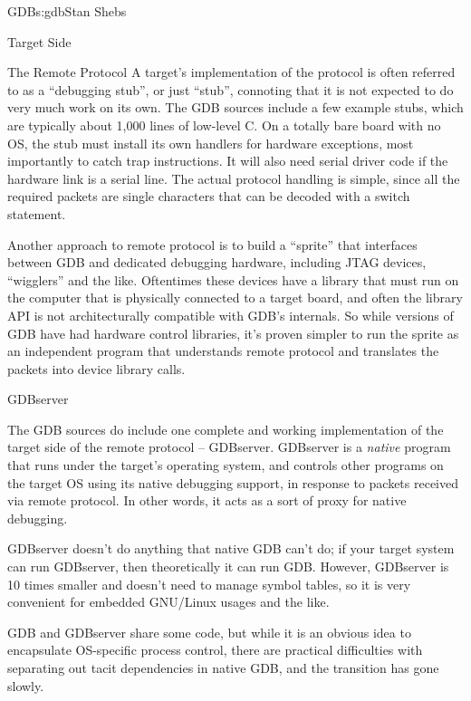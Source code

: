 \begin{aosachapter}{GDB}{s:gdb}{Stan Shebs}
\begin{aosasect1}{Target Side}
\begin{aosasect2}{The Remote Protocol}
A target's implementation of the protocol is often referred to as a
``debugging stub'', or just ``stub'', connoting that it is not expected
to do very much work on its own.  The GDB sources include a few
example stubs, which are typically about 1,000 lines of low-level C.
On a totally bare board with no OS, the stub must install its own
handlers for hardware exceptions, most importantly to catch trap
instructions.  It will also need serial driver code if the hardware
link is a serial line.  The actual protocol handling is simple, since
all the required packets are single characters that can be decoded
with a switch statement.

Another approach to remote protocol is to build a ``sprite'' that
interfaces between GDB and dedicated debugging hardware, including
JTAG devices, ``wigglers'' and the like.  Oftentimes these devices
have a library that must run on the computer that is physically
connected to a target board, and often the library API is not
architecturally compatible with GDB's internals.  So while versions of
GDB have had hardware control libraries, it's proven simpler to run
the sprite as an independent program that understands remote protocol
and translates the packets into device library calls.

\end{aosasect2}

\begin{aosasect2}{GDBserver}

The GDB sources do include one complete and working implementation of
the target side of the remote protocol -- GDBserver.  GDBserver is a
{\em native} program that runs under the target's operating system,
and controls other programs on the target OS using its native
debugging support, in response to packets received via remote protocol.
In other words, it acts as a sort of proxy for native debugging.

GDBserver doesn't do anything that native GDB can't do; if your target
system can run GDBserver, then theoretically it can run GDB.  However,
GDBserver is 10 times smaller and doesn't need to manage symbol
tables, so it is very convenient for embedded GNU/Linux usages and the
like.


GDB and GDBserver share some code, but while it is an obvious idea to
encapsulate OS-specific process control, there are practical difficulties
with separating out tacit dependencies in native GDB, and the transition
has gone slowly.


\end{aosasect2}
\end{aosasect1}
\end{aosachapter}
